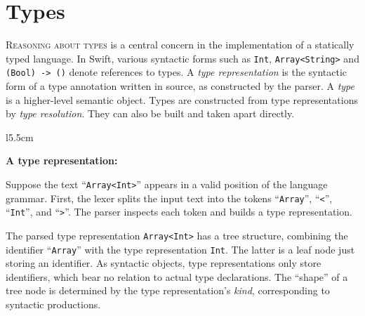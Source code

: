 \documentclass[../generics]{subfiles}
\begin{document}
\chapter{Types}\label{types}

\lettrine{R}{easoning about types} is a central concern in the implementation of a statically typed language. In Swift, various syntactic forms such as \texttt{Int}, \texttt{Array<String>} and \texttt{(Bool) -> ()} denote references to types. A \emph{type representation} is the syntactic form of a type annotation written in source, as constructed by the parser. A \emph{type} is a higher-level semantic object. Types are constructed from type representations by \emph{type resolution}. They can also be built and taken apart directly.

\medskip

\begin{wrapfigure}[13]{l}{5.5cm}
\begin{center}
\textbf{A type representation:}
\end{center}
\end{wrapfigure}

Suppose the text ``\texttt{Array<Int>}'' appears in a valid position of the language grammar. First, the lexer splits the input text into the tokens ``\texttt{Array}'', ``\texttt{<}'', ``\texttt{Int}'', and ``\texttt{>}''. The parser inspects each token and builds a type representation.

The parsed type representation \texttt{Array<Int>} has a tree structure, combining the identifier ``\texttt{Array}'' with the type representation \texttt{Int}. The latter is a leaf node just storing an identifier. As syntactic objects, type representations only store identifiers, which bear no relation to actual type declarations. The ``shape'' of a tree node is determined by the type representation's \emph{kind}, corresponding to syntactic productions.
\end{document}
